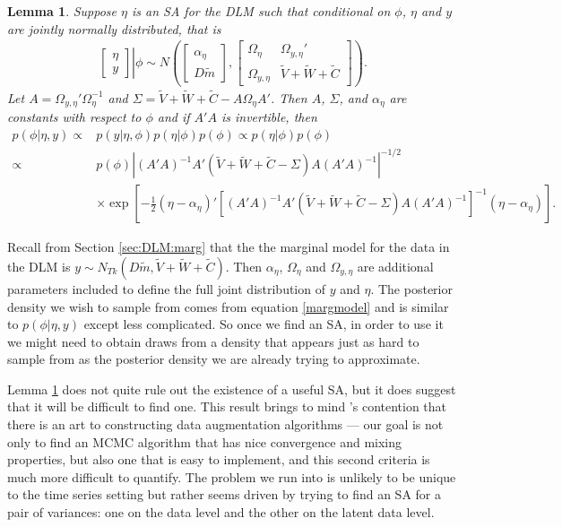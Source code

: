 \documentclass[12pt]{article}
\newtheorem{lem}{Lemma}
\begin{document}
\begin{lem}\label{noSA}
Suppose $\eta$ is an SA for the DLM such that conditional on $\phi$, $\eta$ and $y$ are jointly normally distributed, that is
\begin{align*}
 \left. \begin{bmatrix}\eta \\ y \end{bmatrix}\right|\phi \sim N\left(\begin{bmatrix} \alpha_\eta \\ D\tilde{m} \end{bmatrix}, \begin{bmatrix}
   \Omega_\eta & \Omega_{y,\eta}' \\
   \Omega_{y,\eta} & \tilde{V} + \tilde{W} + \tilde{C} \end{bmatrix}\right).
\end{align*}
Let $A=\Omega_{y,\eta}'\Omega_{\eta}^{-1}$ and $\Sigma = \tilde{V} + \tilde{W} + \tilde{C} - A\Omega_{\eta}A'$. Then $A$, $\Sigma$, and $\alpha_{\eta}$ are constants with respect to $\phi$ and if $A'A$ is invertible, then
\begin{align*}
p(\phi|\eta,y) \propto & p(y|\eta,\phi)p(\eta|\phi)p(\phi) \propto p(\eta|\phi)p(\phi) \\
\propto & p(\phi)|(A'A)^{-1}A'(\tilde{V} + \tilde{W} + \tilde{C} - \Sigma)A(A'A)^{-1}|^{-1/2}\\
&\times \exp\left[-\frac{1}{2}(\eta - \alpha_{\eta})'[(A'A)^{-1}A'(\tilde{V} + \tilde{W} + \tilde{C} - \Sigma)A(A'A)^{-1}]^{-1}(\eta - \alpha_{\eta})\right].
\end{align*}
\end{lem}
\noindent Recall from Section \ref{sec:DLM:marg} that the the marginal model for the data in the DLM is $y\sim N_{Tk}(D\tilde{m}, \tilde{V} + \tilde{W} + \tilde{C})$. Then $\alpha_\eta$, $\Omega_\eta$ and $\Omega_{y,\eta}$ are additional parameters included to define the full joint distribution of $y$ and $\eta$. The posterior density we wish to sample from comes from equation \eqref{margmodel} and is similar to $p(\phi|\eta,y)$ except less complicated. So once we find an SA, in order to use it we might need to obtain draws from a density that appears just as hard to sample from as the posterior density we are already trying to approximate.

Lemma \ref{noSA} does not quite rule out the existence of a useful SA, but it does suggest that it will be difficult to find one. This result brings to mind \citet{van2001art}'s contention that there is an art to constructing data augmentation algorithms --- our goal is not only to find an MCMC algorithm that has nice convergence and mixing properties, but also one that is easy to implement, and this second criteria is much more difficult to quantify. The problem we run into is unlikely to be unique to the time series setting but rather seems driven by trying to find an SA for a pair of variances: one on the data level and the other on the latent data level.
\end{document}
